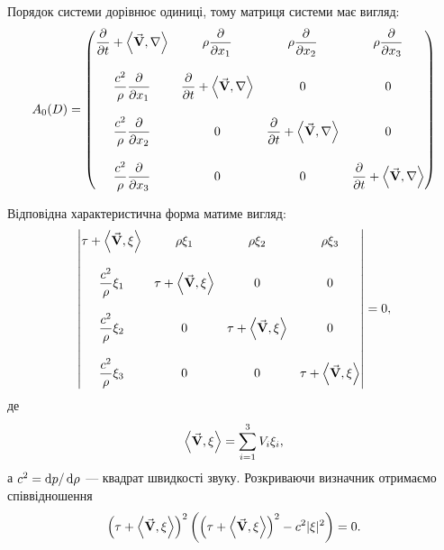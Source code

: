 \begin{solution}
	Порядок системи дорівнює одиниці, тому матриця системи має вигляд:
	\begin{equation}
		A_0(D) = \begin{pmatrix}
			\dfrac{\partial}{\partial t} + \langle \vecf V, \nabla \rangle & \rho \dfrac{\partial}{\partial x_1} & \rho \dfrac{\partial}{\partial x_2} & \rho \dfrac{\partial}{\partial x_3} \\
			\\
			\dfrac{c^2}{\rho} \dfrac{\partial}{\partial x_1} & \dfrac{\partial}{\partial t} + \langle \vecf V, \nabla \rangle & 0 & 0 \\
			\\
			\dfrac{c^2}{\rho} \dfrac{\partial}{\partial x_2} & 0 & \dfrac{\partial}{\partial t} + \langle \vecf V, \nabla \rangle & 0 \\
			\\
			\dfrac{c^2}{\rho} \dfrac{\partial}{\partial x_3} & 0 & 0 & \dfrac{\partial}{\partial t} + \langle \vecf V, \nabla \rangle
		\end{pmatrix}
	\end{equation}

	Відповідна характеристична форма матиме вигляд:
	\begin{equation}
		\begin{vmatrix}
			\tau + \langle \vecf V, \xi \rangle & \rho \xi_1 & \rho \xi_2 & \rho \xi_3 \\
			\\
			\dfrac{c^2}{\rho} \xi_1 & \tau + \langle \vecf V, \xi \rangle & 0 & 0 \\
			\\
			\dfrac{c^2}{\rho} \xi_2 & 0 & \tau + \langle \vecf V, \xi \rangle & 0 \\
			\\
			\dfrac{c^2}{\rho} \xi_3 & 0 & 0 & \tau + \langle \vecf V, \xi \rangle\\
		\end{vmatrix}
		= 0,
	\end{equation}
	де
	\begin{equation}
		\langle \vecf V, \xi \rangle = \Sum_{i = 1}^3 V_i \xi_i,
	\end{equation}
	а $c^2 = \mathop{}\!\mathrm{d} p / \mathop{}\!\mathrm{d} \rho$ --- квадрат швидкості звуку. Розкриваючи визначник отримаємо співвідношення
	\begin{equation}
		\left( \tau + \langle \vecf V, \xi \rangle \right)^2 \left(\left( \tau + \langle \vecf V, \xi \rangle \right)^2 - c^2 |\xi|^2 \right) = 0.
	\end{equation}


\end{solution}
